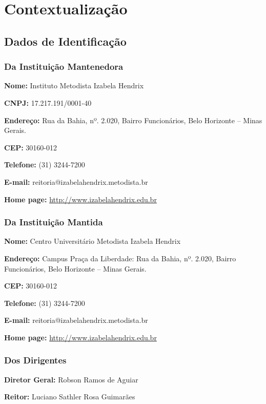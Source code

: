 \documentclass[a4paper, 12pt, openright, oneside, german, french, english, brazil]{abntex2}
\begin{document}
\pretextual
\imprimircapa
\newpage
\tableofcontents

\textual

\part{Contextualização}

\chapter{Dados de Identificação}

\section{Da Instituição Mantenedora}
\textbf{Nome:} Instituto Metodista Izabela Hendrix

\textbf{CNPJ:} 17.217.191/0001-40

\textbf{Endereço:} Rua da Bahia, nº. 2.020, Bairro Funcionários, Belo Horizonte – Minas Gerais.

\textbf{CEP:} 30160-012

\textbf{Telefone:} (31) 3244-7200

\textbf{E-mail:} reitoria@izabelahendrix.metodista.br

\textbf{Home page:} \url{http://www.izabelahendrix.edu.br}

\section{Da Instituição Mantida}
\textbf{Nome:} Centro Universitário Metodista Izabela Hendrix

\textbf{Endereço:} Campus Praça da Liberdade: Rua da Bahia, nº. 2.020, Bairro Funcionários, Belo Horizonte – Minas Gerais.

\textbf{CEP:} 30160-012

\textbf{Telefone:} (31) 3244-7200

\textbf{E-mail:} reitoria@izabelahendrix.metodista.br

\textbf{Home page:} \url{http://www.izabelahendrix.edu.br}

\section{Dos Dirigentes}

\textbf{Diretor Geral:} Robson Ramos de Aguiar

\textbf{Reitor:} Luciano Sathler Rosa Guimarães
\end{document}
